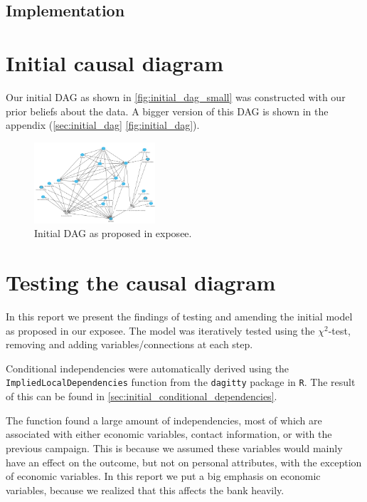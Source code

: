 \documentclass[11pt,]{article}
\begin{document}
\begin{multicols}{2}
\hypertarget{implementation}{%
\subsection{Implementation}\label{implementation}}

\hypertarget{initial-causal-diagram}{%
\section{Initial causal diagram}\label{initial-causal-diagram}}

Our initial DAG as shown in \autoref{fig:initial_dag_small} was
constructed with our prior beliefs about the data. A bigger version of
this DAG is shown in the appendix (\autoref{sec:initial_dag}
\autoref{fig:initial_dag}).

\begin{figure}[H]
    \centering
    \includegraphics[width=0.4\textwidth]{images/initial_dag}
    \caption{Initial DAG as proposed in exposee.}
    \label{fig:initial_dag_small}
\end{figure}

\hypertarget{testing-the-causal-diagram}{%
\section{Testing the causal diagram}\label{testing-the-causal-diagram}}

In this report we present the findings of testing and amending the
initial model as proposed in our exposee. The model was iteratively
tested using the \(\chi^2\)-test, removing and adding
variables/connections at each step.

Conditional independencies were automatically derived using the
\texttt{ImpliedLocalDependencies} function from the \texttt{dagitty}
package in \texttt{R}. The result of this can be found in
\autoref{sec:initial_conditional_dependencies}.

The function found a large amount of independencies, most of which are
associated with either economic variables, contact information, or with
the previous campaign. This is because we assumed these variables would
mainly have an effect on the outcome, but not on personal attributes,
with the exception of economic variables. In this report we put a big
emphasis on economic variables, because we realized that this affects
the bank heavily.


\end{multicols}
\end{document}
